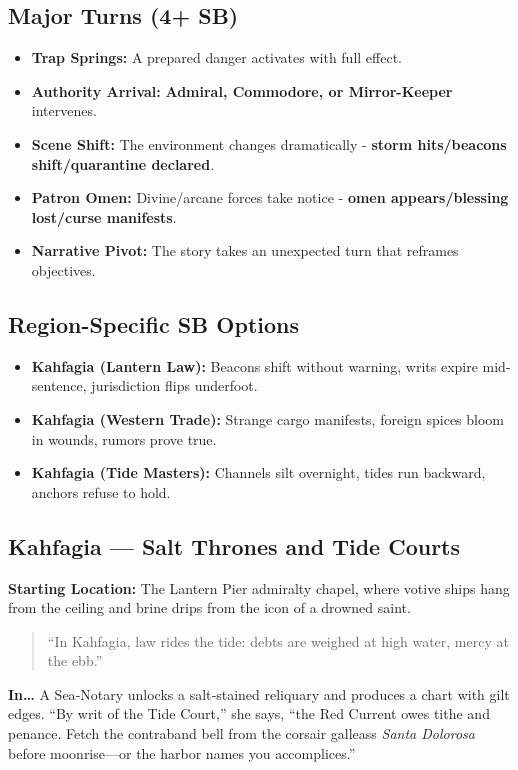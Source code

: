 \subsection*{Major Turns (4+ SB)}
\begin{itemize}
\item \textbf{Trap Springs:} A prepared danger activates with full effect.
\item \textbf{Authority Arrival:} \textbf{Admiral, Commodore, or Mirror-Keeper} intervenes.
\item \textbf{Scene Shift:} The environment changes dramatically - \textbf{storm hits/beacons shift/quarantine declared}.
\item \textbf{Patron Omen:} Divine/arcane forces take notice - \textbf{omen appears/blessing lost/curse manifests}.
\item \textbf{Narrative Pivot:} The story takes an unexpected turn that reframes objectives.
\end{itemize}

\subsection*{Region-Specific SB Options}
\begin{itemize}
\item \textbf{Kahfagia (Lantern Law):} Beacons shift without warning, writs expire mid-sentence, jurisdiction flips underfoot.
\item \textbf{Kahfagia (Western Trade):} Strange cargo manifests, foreign spices bloom in wounds, rumors prove true.
\item \textbf{Kahfagia (Tide Masters):} Channels silt overnight, tides run backward, anchors refuse to hold.
\end{itemize}


\subsection*{Kahfagia — Salt Thrones and Tide Courts}
\textbf{Starting Location:} The Lantern Pier admiralty chapel, where votive ships hang from the ceiling and brine drips from the icon of a drowned saint.

\begin{quote}
“In Kahfagia, law rides the tide: debts are weighed at high water, mercy at the ebb.”
\end{quote}

\textbf{In…} A Sea‑Notary unlocks a salt‑stained reliquary and produces a chart with gilt edges. “By writ of the Tide Court,” she says, “the Red Current owes tithe and penance. Fetch the contraband bell from the corsair galleass \emph{Santa Dolorosa} before moonrise—or the harbor names you accomplices.”

